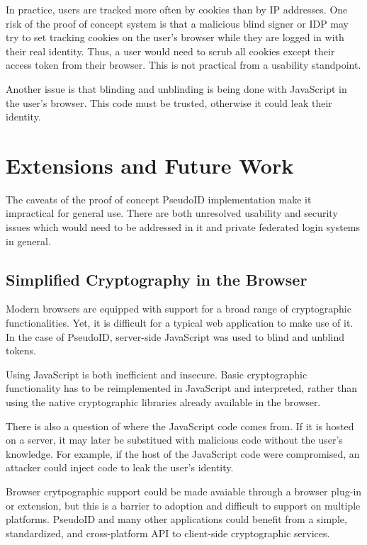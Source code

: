\documentclass{llncs}
\begin{document}
In practice, users are tracked more often by cookies than by IP 
addresses. One risk of the proof of concept system is that a malicious
blind signer or IDP may try to set tracking cookies on the user's
browser while they are logged in with their real identity. Thus, a
user would need to scrub all cookies except their access token from
their browser. This is not practical from a usability standpoint.

Another issue is that blinding and unblinding is being done with
JavaScript in the user's browser. This code must be trusted, otherwise
it could leak their identity. 

\section{Extensions and Future Work}

The caveats of the proof of concept PseudoID implementation make it
impractical for general use. There are both unresolved usability and
security issues which would need to be addressed in it and private
federated login systems in general.

\subsection{Simplified Cryptography in the Browser}

Modern browsers are equipped with support for a broad range of
cryptographic functionalities. Yet, it is difficult for a typical
web application to make use of it. In the case of PseudoID,
server-side JavaScript was used to blind and unblind tokens.

Using JavaScript is both inefficient and insecure. Basic cryptographic
functionality has to be reimplemented in JavaScript and interpreted,
rather than using the native cryptographic libraries already available
in the browser.

There is also a question of where the JavaScript code comes from. If
it is hosted on a server, it may later be substitued with malicious
code without the user's knowledge. For example, if the host of the
JavaScript code were compromised, an attacker could inject code to
leak the user's identity.

Browser crytpographic support could be made avaiable through
a browser plug-in or extension, but this is a barrier to adoption and
difficult to support on multiple platforms. PseudoID and many other
applications could benefit from a simple, standardized, and
cross-platform API to client-side cryptographic services.
\end{document}

